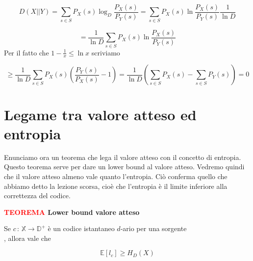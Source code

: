 \documentclass[12pt]{report}
\begin{document}
    \begin{dimo}
        $$D(X||Y) = \sum_{s \in S} P_X(s) \log_D{\frac{P_X(s)}{P_Y(s)}} = \sum_{s \in S} P_X(s) \ln{\frac{P_X(s)}{P_Y(s)}} \frac{1}{\ln{D}}$$

        $$= \frac{1}{\ln{D}} \sum_{s \in S} P_X(s) \ln{\frac{P_X(s)}{P_Y(s)}} $$
        Per il fatto che $1-\frac{1}{x} \leq \ln{x}$ scriviamo

        $$\geq \frac{1}{\ln{D}} \sum_{s \in S} P_X(s)( \frac{P_Y(s)}{P_X(s)} - 1) =  \frac{1}{\ln{D}} (\sum_{s \in S} P_X(s) - \sum_{s \in S} P_Y(s)) = 0 $$
    \end{dimo}

    \section{Legame tra valore atteso ed entropia}

    Enunciamo ora un teorema che lega il valore atteso con il concetto di entropia. Questo teorema serve per dare un lower bound al valore atteso. Vedremo quindi che il valore atteso almeno vale quanto l'entropia. Ciò conferma quello che abbiamo detto la lezione scorsa, cioè che l'entropia è il limite inferiore alla correttezza del codice.

    \vspace{5px}
    \begin{tcolorbox}
        \textbf{\textcolor{red}{TEOREMA} Lower bound valore atteso }
        \vspace{5px}
        \begin{center}
            Se $c\, :\, \mathbb{X} \rightarrow \mathbb{D}^+$ è un codice istantaneo $d$-ario per una sorgente \\ \modello , allora vale che

            $$\mathbb{E}[l_c] \geq H_D(X)$$
        \end{center}
    \end{tcolorbox}
\end{document}
